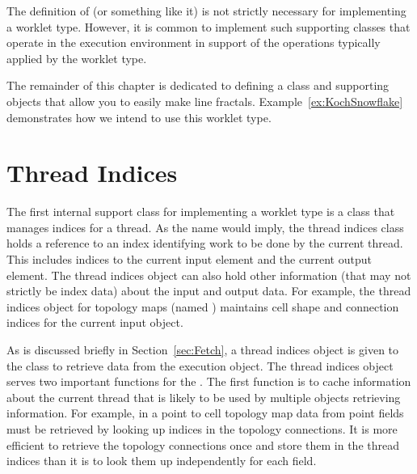 \begin{didyouknow}
  The definition of  (or something like it) is not strictly necessary for implementing a worklet type.
  However, it is common to implement such supporting classes that operate in the execution environment in support of the operations typically applied by the worklet type.
\end{didyouknow}

The remainder of this chapter is dedicated to defining a  class and supporting objects that allow you to easily make line fractals.
Example~\ref{ex:KochSnowflake} demonstrates how we intend to use this worklet type.


\section{Thread Indices}
\label{sec:ThreadIndices}


The first internal support class for implementing a worklet type is a class that manages indices for a thread.
As the name would imply, the thread indices class holds a reference to an index identifying work to be done by the current thread.
This includes indices to the current input element and the current output element.
The thread indices object can also hold other information (that may not strictly be index data) about the input and output data.
For example, the thread indices object for topology maps (named ) maintains cell shape and connection indices for the current input object.

As is discussed briefly in Section~\ref{sec:Fetch}, a thread indices object is given to the  class to retrieve data from the execution object.
The thread indices object serves two important functions for the .
The first function is to cache information about the current thread that is likely to be used by multiple objects retrieving information.
For example, in a point to cell topology map data from point fields must be retrieved by looking up indices in the topology connections.
It is more efficient to retrieve the topology connections once and store them in the thread indices than it is to look them up independently for each field.

